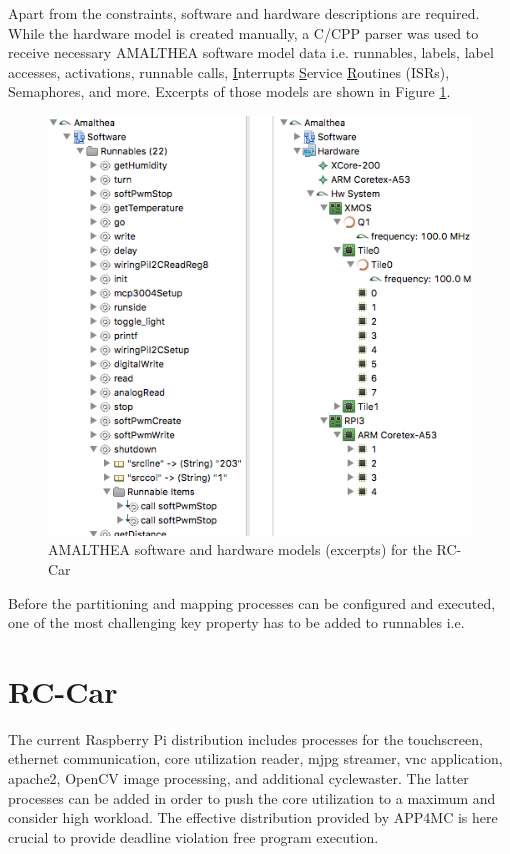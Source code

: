 \documentclass [a4paper,final,conference,10pt]{IDAACS}
\begin{document}
Apart from the constraints, software and hardware descriptions are required. While the hardware model is created manually, a C/CPP parser was used to receive necessary AMALTHEA software model data i.e. runnables, labels, label accesses, activations, runnable calls, \underline{I}nterrupts \underline{S}ervice \underline{R}outines (ISRs), Semaphores, and more. Excerpts of those models are shown in Figure \ref{fig:model}.
\begin{figure}[bth]
\centering
\includegraphics[scale=0.4]{images/models.png}
\caption{\label{fig:model}AMALTHEA software and hardware models (excerpts) for the RC-Car}
\end{figure}

Before the partitioning and mapping processes can be configured and executed, one of the most challenging key property has to be added to runnables i.e. 
\section{RC-Car}
\label{sec:rccar}
The current Raspberry Pi distribution includes processes for the touchscreen, ethernet communication, core utilization reader, mjpg streamer, vnc application, apache2, OpenCV image processing, and additional cyclewaster. The latter processes can be added in order to push the core utilization to a maximum and consider high workload. The effective distribution provided by APP4MC is here crucial to provide deadline violation free program execution. 
\end{document}
